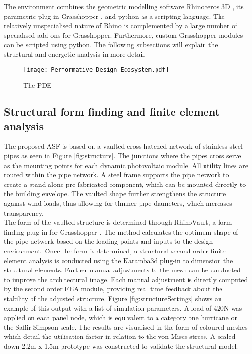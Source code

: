 The environment combines the geometric modelling software Rhinoceros 3D \cite{Rhino}, its parametric plug-in Grasshopper \cite{grasshopper}, and python \cite{python} as a scripting language. The relatively unspecialised nature of Rhino is complemented by a large number of specialised add-ons for Grasshopper. Furthermore, custom Grasshopper modules can be scripted using python. The following subsections will explain the structural and energetic analysis in more detail.

\begin{figure}
\begin{center}
\texttt{[image: Performative\_Design\_Ecosystem.pdf]}
\caption{The PDE}
\label{fig:performative}
\end{center}
\end{figure}

\subsection{Structural form finding and finite element analysis}

The proposed ASF is based on a vaulted cross-hatched network of stainless steel pipes as seen in Figure \ref{fig:structure}. The junctions where the pipes cross serve as the mounting points for each dynamic photovoltaic module. All utility lines are routed within the pipe network. A steel frame supports the pipe network to create a stand-alone pre fabricated component, which can be mounted directly to the building envelope. The vaulted shape further strengthens the structure against wind loads, thus allowing for thinner pipe diameters, which increases transparency. \\


The form of the vaulted structure is determined through RhinoVault, a form finding plug in for Grasshopper \cite{Rippmann2012}. The method calculates the optimum shape of the pipe network based on the loading points and inputs to the design environment. Once the form is determined, a structural second order finite element analysis is conducted using the Karamba3d plug-in \cite{karamba} to dimension the structural elements. Further manual adjustments to the mesh can be conducted to improve the architectural image. Each manual adjustment is directly computed by the second order FEA module, providing real time feedback about the stability of the adjusted structure.  Figure \ref{fig:structureSettings} shows an example of this output with a list of simulation parameters. A load of 420N was applied on each panel node, which is equivalent to a category one hurricane on the Saffir-Simpson scale. The results are visualised in the form of coloured meshes which detail the utilisation factor in relation to the von Mises stress. A scaled down 2.2m x 1.5m prototype was constructed to validate the structural model. 

